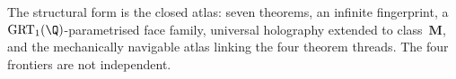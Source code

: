 The structural form is the closed atlas: seven theorems, an infinite
fingerprint, a $\mathrm{GRT}_{1}(\Q)$-parametrised face family,
universal holography extended to class~$\mathbf{M}$, and the
mechanically navigable atlas linking the four theorem threads. The
four frontiers are not independent.

